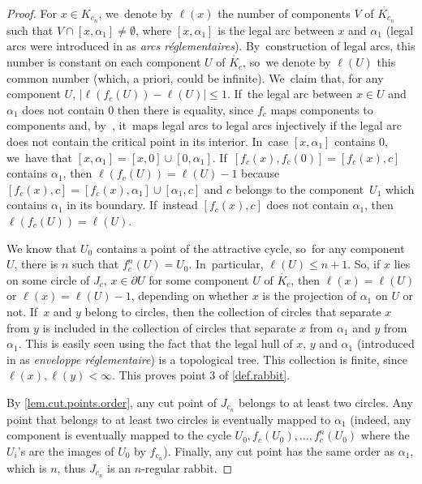 \documentclass[JEP,XML,SOM,Unicode,NoFloatCountersInSection,published]{cedram}
\theoremstyle{plain}
\theoremstyle{definition}
\theoremstyle{remark}
\begin{document}
\begin{proof}
For $x\in K_{c_n}$, we~denote by $\ell(x)$ the number of components $V$ of $\mathring{K_{c_n}}$ such that $V\cap[x,\alpha_1]\neq\emptyset$, where $[x,\alpha_1]$ is the legal arc between $x$ and $\alpha_1$ (legal arcs were introduced in \cite[Exp.\,II, \S6]{douady-hubbard-I} as \textit{arcs réglementaires}). By~construction of legal arcs, this number is constant on each component $U$ of $\mathring{K_c}$, so~we denote by $\ell(U)$ this common number (which, a priori, could be infinite). We~claim that, for any component $U$, $|\ell(f_c(U))-\ell(U)|\leq 1$. If~the legal arc between $x\in U$ and $\alpha_1$ does not contain $0$ then there is equality, since $f_c$ maps components to components and, by~\cite[Exp.\,IV, Lem.\,1]{douady-hubbard-I}, it~maps legal arcs to legal arcs injectively if the legal arc does not contain the critical point in its interior. In~case $[x,\alpha_1]$ contains $0$, we~have that $[x,\alpha_1]=[x,0]\cup[0,\alpha_1]$. If~$[f_c(x),f_c(0)]=[f_c(x),c]$ contains $\alpha_1$, then $\ell(f_c(U))=\ell(U)-1$ because $[f_c(x),c]=[f_c(x),\alpha_1]\cup[\alpha_1,c]$ and $c$ belongs to the component~$U_1$ which contains $\alpha_1$ in its boundary. If~instead $[f_c(x),c]$ does not contain $\alpha_1$, then $\ell(f_c(U))=\ell(U)$.

We know that $U_0$ contains a point of the attractive cycle, so~for any component $U$, there is $n$ such that $f_c^n(U)=U_0$. In~particular, $\ell(U)\leq n+1$.
So, if $x$ lies on some circle of $J_c$, \ie $x\in\partial U$ for some component $U$ of $\mathring{K_c}$, then $\ell(x)=\ell(U)$ or $\ell(x)=\ell(U)-1$, depending on whether $x$ is the projection of $\alpha_1$ on $U$ or not. If~$x$ and $y$ belong to circles, then the collection of circles that separate $x$ from $y$ is included in the collection of circles that separate $x$ from $\alpha_1$ and $y$ from $\alpha_1$. This is easily seen using the fact that the legal hull of $x$, $y$ and $\alpha_1$ (introduced in \cite[Exp.\,II, \S7]{douady-hubbard-I} as \textit{enveloppe réglementaire}) is a topological tree.
This collection is finite, since $\ell(x),\ell(y)<\infty$.
This proves point 3 of \cref{def.rabbit}.

By \cref{lem.cut.points.order}, any cut point of $J_{c_n}$ belongs to at least two circles.
Any point that belongs to at least two circles is eventually mapped to $\alpha_1$ (indeed, any component is eventually mapped to the cycle $U_0, f_c(U_0), \dots, f_c^n(U_0)$ where the $U_i$'s are the images of $U_0$ by $f_{c_n}$).
Finally, any cut point has the same order as $\alpha_1$, which is $n$, thus $J_{c_n}$ is an $n$-regular rabbit.
\end{proof}
\end{document}
